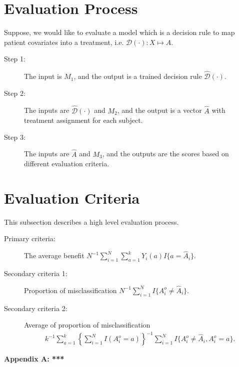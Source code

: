 \documentclass[12pt]{article}
\renewcommand{\theequation} {\arabic{section}.\arabic{equation}}
\def\hat{\widehat}
\def\cal{\mathcal}
\def\calD{{\cal D}} %
\begin{document}
\section{Evaluation Process} \label{sec.EvalProc}

Suppose, we would like to evaluate a model which is a decision rule to map patient covariates into a treatment, i.e. $\calD(\cdot): X \mapsto A$.
\begin{description}
	\item[Step 1:] The input is $M_1$, and the output is a trained decision rule $\hat{\calD}(\cdot)$.
	\item[Step 2:] The inputs are $\hat{\calD}(\cdot)$ and $M_2$, and the output is a vector $\hat{A}$ with treatment assignment for each subject.
	\item[Step 3:] The inputs are $\hat{A}$ and $M_3$, and the outputs are the scores based on different evaluation criteria.
\end{description}

\section{Evaluation Criteria}
This subsection describes a high level evaluation process.



\begin{description}
	\item[Primary criteria:]  The average benefit $N^{-1}\sum_{i=1}^{N} \sum_{a=1}^k Y_{i}(a) I\{a=\hat{A}_i\}$.
	\item[Secondary criteria 1:] Proportion of misclassification $N^{-1}\sum_{i=1}^{N} I\{A^o_i \neq \hat{A}_i\}$.
	\item[Secondary criteria 2:] Average of proportion of misclassification
	\begin{eqnarray*}
		k^{-1} \sum_{a=1}^k \left\{\sum_{i=1}^{N} I(A^o_i=a)\right\}^{-1} \sum_{i=1}^{N} I\{A^o_i \neq  \hat{A}_i, A^o_i=a\}.
	\end{eqnarray*}
\end{description}








\setcounter{equation}{0}
\renewcommand{\theequation} {A.\arabic{equation}}
\begin{center}
	\bf \Large Appendix A: ***
\end{center}
\end{document}
